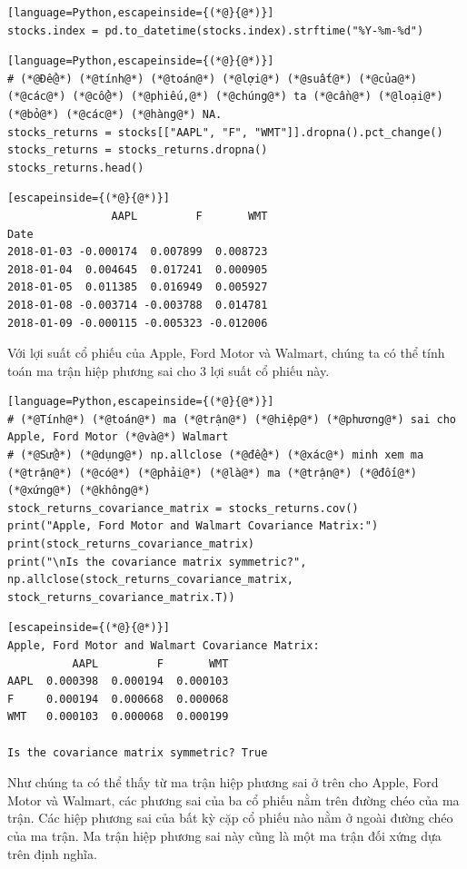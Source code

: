 \begin{lstlisting}[language=Python,escapeinside={(*@}{@*)}]
stocks.index = pd.to_datetime(stocks.index).strftime("%Y-%m-%d")
\end{lstlisting}

\begin{lstlisting}[language=Python,escapeinside={(*@}{@*)}]
# (*@Để@*) (*@tính@*) (*@toán@*) (*@lợi@*) (*@suất@*) (*@của@*) (*@các@*) (*@cổ@*) (*@phiếu,@*) (*@chúng@*) ta (*@cần@*) (*@loại@*) (*@bỏ@*) (*@các@*) (*@hàng@*) NA.
stocks_returns = stocks[["AAPL", "F", "WMT"]].dropna().pct_change()
stocks_returns = stocks_returns.dropna()
stocks_returns.head()
\end{lstlisting}

\begin{lstlisting}[escapeinside={(*@}{@*)}]
                AAPL         F       WMT
Date                                    
2018-01-03 -0.000174  0.007899  0.008723
2018-01-04  0.004645  0.017241  0.000905
2018-01-05  0.011385  0.016949  0.005927
2018-01-08 -0.003714 -0.003788  0.014781
2018-01-09 -0.000115 -0.005323 -0.012006
\end{lstlisting}

Với lợi suất cổ phiếu của Apple, Ford Motor và Walmart, chúng ta có thể tính toán ma trận hiệp phương sai cho 3 lợi suất cổ phiếu này.

\begin{lstlisting}[language=Python,escapeinside={(*@}{@*)}]
# (*@Tính@*) (*@toán@*) ma (*@trận@*) (*@hiệp@*) (*@phương@*) sai cho Apple, Ford Motor (*@và@*) Walmart
# (*@Sử@*) (*@dụng@*) np.allclose (*@để@*) (*@xác@*) minh xem ma (*@trận@*) (*@có@*) (*@phải@*) (*@là@*) ma (*@trận@*) (*@đối@*) (*@xứng@*) (*@không@*)
stock_returns_covariance_matrix = stocks_returns.cov()
print("Apple, Ford Motor and Walmart Covariance Matrix:")
print(stock_returns_covariance_matrix)
print("\nIs the covariance matrix symmetric?", np.allclose(stock_returns_covariance_matrix, stock_returns_covariance_matrix.T))
\end{lstlisting}

\begin{lstlisting}[escapeinside={(*@}{@*)}]
Apple, Ford Motor and Walmart Covariance Matrix:
          AAPL         F       WMT
AAPL  0.000398  0.000194  0.000103
F     0.000194  0.000668  0.000068
WMT   0.000103  0.000068  0.000199

Is the covariance matrix symmetric? True
\end{lstlisting}

Như chúng ta có thể thấy từ ma trận hiệp phương sai ở trên cho Apple, Ford Motor và Walmart, các phương sai của ba cổ phiếu nằm trên đường chéo của ma trận. Các hiệp phương sai của bất kỳ cặp cổ phiếu nào nằm ở ngoài đường chéo của ma trận. Ma trận hiệp phương sai này cũng là một ma trận đối xứng dựa trên định nghĩa.

